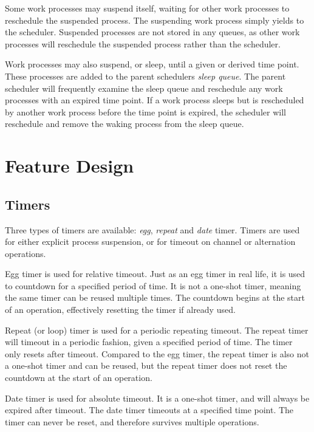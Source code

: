 Some work processes may suspend itself, waiting for other work processes to reschedule the suspended process. The suspending work process simply yields to the scheduler. Suspended processes are not stored in any queues, as other work processes will reschedule the suspended process rather than the scheduler. 

Work processes may also suspend, or sleep, until a given or derived time point. These processes are added to the parent schedulers \textit{sleep queue}. The parent scheduler will frequently examine the sleep queue and reschedule any work processes with an expired time point. If a work process sleeps but is rescheduled by another work process before the time point is expired, the scheduler will reschedule and remove the waking process from the sleep queue.


\section{Feature Design}




\subsection{Timers}


Three types of timers are available: \textit{egg}, \textit{repeat} and \textit{date} timer. Timers are used for either explicit process suspension, or for timeout on channel or alternation operations. 

Egg timer is used for relative timeout. Just as an egg timer in real life, it is used to countdown for a specified period of time. It is not a one\hyp{}shot timer, meaning the same timer can be reused multiple times. The countdown begins at the start of an operation, effectively resetting the timer if already used.

Repeat (or loop) timer is used for a periodic repeating timeout. The repeat timer will timeout in a periodic fashion, given a specified period of time. The timer only resets after timeout. Compared to the egg timer, the repeat timer is also not a one\hyp{}shot timer and can be reused, but the repeat timer does not reset the countdown at the start of an operation.

Date timer is used for absolute timeout. It is a one\hyp{}shot timer, and will always be expired after timeout. The date timer timeouts at a specified time point. The timer can never be reset, and therefore survives multiple operations.


